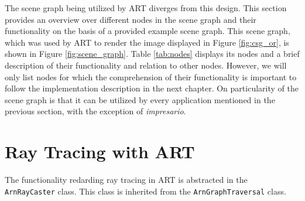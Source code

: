 The scene graph being utilized by ART diverges from this design. This section provides an overview over different nodes in the scene graph and their functionality on the basis of a provided example scene graph. This scene graph, which was used by ART to render the image displayed in Figure \ref{fig:csg_or}, is shown in Figure \ref{fig:scene_graph}. Table \ref{tab:nodes} displays its nodes and a brief description of their functionality and relation to other nodes. However, we will only list nodes for which the comprehension of their functionality is important to follow the implementation description in the next chapter.
On particularity of the scene graph is that it can be utilized by every application mentioned in the previous section, with the exception of \emph{impresario}.

\section{Ray Tracing with ART}
The functionality redarding ray tracing in ART is abstracted in the \texttt{ArnRayCaster} class. This class is inherited from the \texttt{ArnGraphTraversal} class. 

